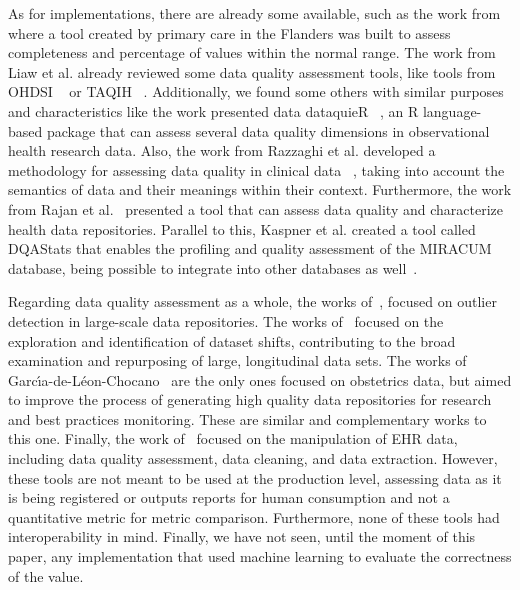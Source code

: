 As for implementations, there are already some available, such as the work from \cite{phanAutomatedDataCleaning2020} where a tool created by primary care in the Flanders was built to assess completeness and percentage of values within the normal range. The work from Liaw et al. \cite{liawQualityAssessmentRealworld2021} already reviewed some data quality assessment tools, like tools from OHDSI \unskip~\cite{hripcsakObservationalHealthData2015} or TAQIH \unskip~\cite{alvarezsanchezTAQIHToolTabular2019}. Additionally, we found some others with similar purposes and characteristics like the work presented data dataquieR \unskip~\cite{schmidtFacilitatingHarmonizedData2021}, an R language-based package that can assess several data quality dimensions in observational health research data. Also, the work from Razzaghi et al. developed a methodology for assessing data quality in clinical data \unskip~\cite{razzaghiDevelopingSystematicApproach2022}, taking into account the semantics of data and their meanings within their context. Furthermore, the work from Rajan et al.\unskip~\cite{rajanContentAgnosticComputable2019} presented a tool that can assess data quality and characterize health data repositories. Parallel to this, Kaspner et al. created a tool called DQAStats that enables the profiling and quality assessment of the MIRACUM database, being possible to integrate into other databases as well\unskip~\cite{kapsnerLinkingConsortiumWideData2021a}.


Regarding data quality assessment as a whole, the works of\unskip~\cite{estiriSemisupervisedEncodingOutlier2019}, focused on outlier detection in large-scale data repositories. The works of\unskip~\cite{saezEHRtemporalVariabilityDelineatingTemporal2020} focused on the exploration and identification of dataset shifts, contributing to the broad examination and repurposing of large, longitudinal data sets. The works of Garc\'{\i}a-de-L{\'e}on-Chocano\unskip~\cite{garci;a-de-leon-chocanoConstructionQualityassuredInfant2015,garcia-de-leon-chocanoConstructionQualityassuredInfant2016,saStandardizedDataQuality2017} are the only ones focused on obstetrics data, but aimed to improve the process of generating high quality data repositories for research and best practices monitoring. These are similar and complementary works to this one. Finally, the work of\unskip~\cite{springateREHRPackageManipulating2017} focused on the manipulation of EHR data, including data quality assessment, data cleaning, and data extraction. However, these tools are not meant to be used at the production level, assessing data as it is being registered or outputs reports for human consumption and not a quantitative metric for metric comparison. Furthermore, none of these tools had interoperability in mind. Finally, we have not seen, until the moment of this paper, any implementation that used machine learning to evaluate the correctness of the value.

